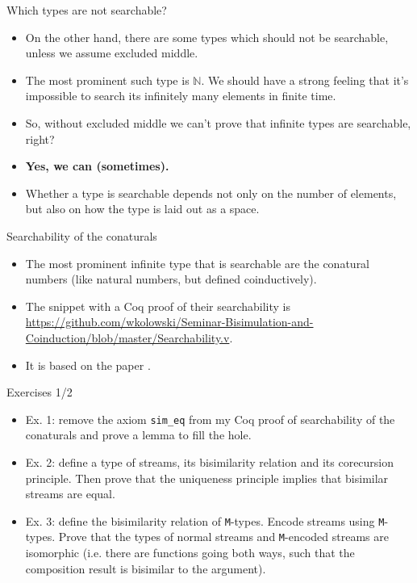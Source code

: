 \documentclass{beamer}
\begin{document}
\begin{frame}{Which types are not searchable?}
\begin{itemize}
	\item On the other hand, there are some types which should not be searchable, unless we assume excluded middle.
	\item The most prominent such type is $\mathbb{N}$. We should have a strong feeling that it's impossible to search its infinitely many elements in finite time.
	\item So, without excluded middle we can't prove that infinite types are searchable, right?
	\item \textbf{Yes, we can (sometimes).}
	\item Whether a type is searchable depends not only on the number of elements, but also on how the type is laid out as a space.
\end{itemize}
\end{frame}

\begin{frame}{Searchability of the conaturals}
\begin{itemize}
	\item The most prominent infinite type that is searchable are the conatural numbers (like natural numbers, but defined coinductively).
	\item The snippet with a Coq proof of their searchability is \url{https://github.com/wkolowski/Seminar-Bisimulation-and-Coinduction/blob/master/Searchability.v}.
	\item It is based on the paper \href{https://www.cs.bham.ac.uk/~mhe/papers/omniscient-journal-revised.pdf}{\color{blue}{Infinite sets that Satisfy the Principle of Omniscience in any Variety of Constructive Mathematics}}.
\end{itemize}
\end{frame}

\begin{frame}{Exercises 1/2}
\begin{itemize}
	\item Ex. 1: remove the axiom \texttt{sim\_eq} from my Coq proof of searchability of the conaturals and prove a lemma to fill the hole.
	\item Ex. 2: define a type of streams, its bisimilarity relation and its corecursion principle. Then prove that the uniqueness principle implies that bisimilar streams are equal.
	\item Ex. 3: define the bisimilarity relation of \texttt{M}-types. Encode streams using \texttt{M}-types. Prove that the types of normal streams and \texttt{M}-encoded streams are isomorphic (i.e. there are functions going both ways, such that the composition result is bisimilar to the argument).
\end{itemize}
\end{frame}
\end{document}
